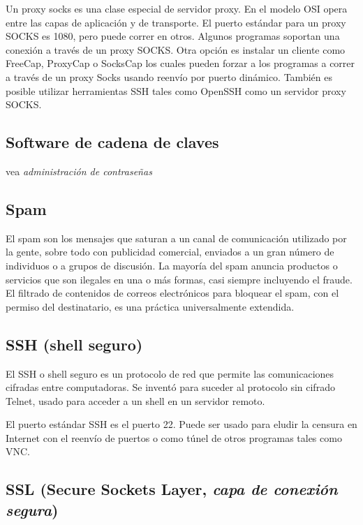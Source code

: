 Un proxy socks es una clase especial de servidor proxy. En el modelo OSI
opera entre las capas de aplicación y de transporte. El puerto estándar
para un proxy SOCKS es 1080, pero puede correr en otros. Algunos
programas soportan una conexión a través de un proxy SOCKS. Otra opción
es instalar un cliente como FreeCap, ProxyCap o SocksCap los cuales
pueden forzar a los programas a correr a través de un proxy Socks usando
reenvío por puerto dinámico. También es posible utilizar herramientas
SSH tales como OpenSSH como un servidor proxy SOCKS.

\subsection{Software de cadena de
claves}\label{software-de-cadena-de-claves}

vea \emph{administración de contraseñas}

\subsection{Spam}\label{spam}

El spam son los mensajes que saturan a un canal de comunicación
utilizado por la gente, sobre todo con publicidad comercial, enviados a
un gran número de individuos o a grupos de discusión. La mayoría del
spam anuncia productos o servicios que son ilegales en una o más formas,
casi siempre incluyendo el fraude. El filtrado de contenidos de correos
electrónicos para bloquear el spam, con el permiso del destinatario, es
una práctica universalmente extendida.

\subsection{SSH (shell seguro)}\label{ssh-shell-seguro}

El SSH o shell seguro es un protocolo de red que permite las
comunicaciones cifradas entre computadoras. Se inventó para suceder al
protocolo sin cifrado Telnet, usado para acceder a un shell en un
servidor remoto.

El puerto estándar SSH es el puerto 22. Puede ser usado para eludir la
censura en Internet con el reenvío de puertos o como túnel de otros
programas tales como VNC.

\subsection{\texorpdfstring{SSL (Secure Sockets Layer, \emph{capa de
conexión
segura})}{SSL (Secure Sockets Layer, capa de conexión segura)}}\label{ssl-secure-sockets-layer-capa-de-conexiuxf3n-segura}

